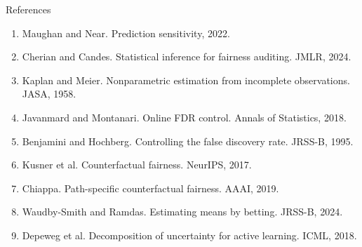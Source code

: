 \documentclass[aspectratio=169,11pt]{beamer}
\begin{document}
\begin{frame}[allowframebreaks]{References}
\begin{enumerate}
\item Maughan and Near. Prediction sensitivity, 2022.
\item Cherian and Candes. Statistical inference for fairness auditing. JMLR, 2024.
\item Kaplan and Meier. Nonparametric estimation from incomplete observations. JASA, 1958.
\item Javanmard and Montanari. Online FDR control. Annals of Statistics, 2018.
\item Benjamini and Hochberg. Controlling the false discovery rate. JRSS-B, 1995.
\item Kusner et al. Counterfactual fairness. NeurIPS, 2017.
\item Chiappa. Path-specific counterfactual fairness. AAAI, 2019.
\item Waudby-Smith and Ramdas. Estimating means by betting. JRSS-B, 2024.
\item Depeweg et al. Decomposition of uncertainty for active learning. ICML, 2018.
\end{enumerate}
\end{frame}
\end{document}

